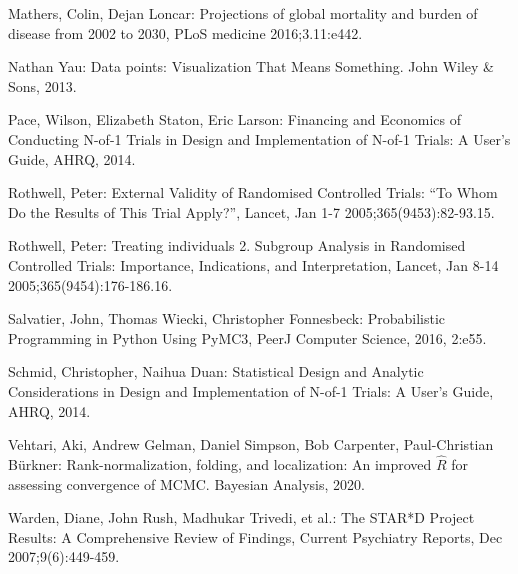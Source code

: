 \documentclass[12pt,a4paper,leqno]{report}
\theoremstyle{plain}
\theoremstyle{definition}
\theoremstyle{remark}
\begin{document}
\begin{thebibliography}{4}
    Mathers, Colin, Dejan Loncar: Projections of global mortality and burden
    of disease from 2002 to 2030, PLoS medicine 2016;3.11:e442.

    Nathan Yau: Data points: Visualization That Means Something.
    John Wiley \& Sons, 2013.

    Pace, Wilson, Elizabeth Staton, Eric Larson: Financing and Economics
    of Conducting N-of-1 Trials in Design and Implementation of N-of-1 Trials: A
    User's Guide, AHRQ, 2014.

    Rothwell, Peter: External Validity of Randomised Controlled Trials: “To Whom Do the
    Results of This Trial Apply?”, Lancet, Jan 1-7 2005;365(9453):82-93.15.

    Rothwell, Peter: Treating individuals 2. Subgroup Analysis in Randomised Controlled
    Trials: Importance, Indications, and Interpretation, Lancet, Jan 8-14
    2005;365(9454):176-186.16.
    
    Salvatier, John, Thomas Wiecki, Christopher Fonnesbeck: Probabilistic Programming in Python Using PyMC3, PeerJ Computer
    Science, 2016, 2:e55.

    Schmid, Christopher, Naihua Duan: Statistical Design and Analytic
    Considerations in Design and Implementation of N-of-1 Trials: A User's
    Guide, AHRQ, 2014.

    Vehtari, Aki, Andrew Gelman, Daniel Simpson, Bob Carpenter, Paul-Christian Bürkner:
    Rank-normalization, folding, and localization: An improved $\widehat {R} $ for
    assessing convergence of MCMC. Bayesian Analysis, 2020.
   
    Warden, Diane, John Rush, Madhukar Trivedi, et al.: The STAR*D Project Results: A Comprehensive Review of Findings, Current Psychiatry Reports, Dec 2007;9(6):449-459.
  
\end{thebibliography}
\end{document}
